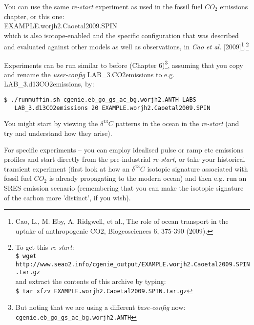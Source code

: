 \documentclass[11pt,fleqn]{book} %
\begin{document}
\newpage

You can use the same \textit{re-start} experiment as used in the fossil fuel \(CO_{2}\) emissions chapter, or this one:
\vspace{1mm}
\\\textsf{\footnotesize EXAMPLE.worjh2.Caoetal2009.SPIN} 
\vspace{1mm}
\\which is also isotope-enabled and the specific configuration that was described and evaluated against other models as well as observations, in \textit{Cao et al.} [2009]\footnote{Cao, L., M. Eby, A. Ridgwell, et al., The role of ocean transport in the uptake of anthropogenic CO2, Biogeosciences 6, 375-390 (2009).}.\footnote{To get this \textit{re-start}:
\\\texttt{\$ wget http://www.seao2.info/cgenie\_output/EXAMPLE.worjh2.Caoetal2009.SPIN.tar.gz}
\\and extract the contents of this archive by typing:
\\\texttt{\$ tar xfzv EXAMPLE.worjh2.Caoetal2009.SPIN.tar.gz}
}

Experiments can  be run similar to before (Chapter 6)\footnote{But noting that we are using a different \textit{base-config} now: \texttt{cgenie.eb\_go\_gs\_ac\_bg.worjh2.ANTH}}, assuming that you copy and rename the \textit{user-config} \textsf{\footnotesize LAB\_3.CO2emissions} to e.g. \textsf{\footnotesize LAB\_3.d13CO2emissions}, by:
\vspace{-2pt}\begin{verbatim}
$ ./runmuffin.sh cgenie.eb_go_gs_ac_bg.worjh2.ANTH LABS
   LAB_3.d13CO2emissions 20 EXAMPLE.worjh2.Caoetal2009.SPIN
\end{verbatim}\vspace{-2pt}

You might start by viewing the \(\delta^{13}C\) patterns in the ocean in the \textit{re-start} (and try and understand how they arise). 

For specific experiments -- you can employ idealised pulse or ramp etc emissions profiles and start directly from the pre-industrial \textit{re-start}, or take your historical transient experiment (first look at how an  \(\delta^{13}C\) isotopic signature associated with fossil fuel \(CO_{2}\) is already propagating to the modern ocean) and then e.g. run an SRES emission scenario (remembering that you can make the isotopic signature of the carbon more 'distinct', if you wish). 
\end{document}
